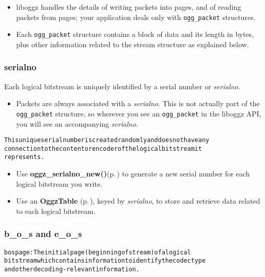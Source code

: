\begin{itemize}
\item liboggz handles the details of writing packets into pages, and of reading packets from pages; your application deals only with {\tt ogg\_\-packet} structures.\item Each {\tt ogg\_\-packet} structure contains a block of data and its length in bytes, plus other information related to the stream structure as explained below.\end{itemize}
\subsubsection{serialno}\label{serialno}
Each logical bitstream is uniquely identified by a serial number or {\em serialno\/}.

\begin{itemize}
\item Packets are always associated with a {\em serialno\/}. This is not actually part of the {\tt ogg\_\-packet} structure, so wherever you see an {\tt ogg\_\-packet} in the liboggz API, you will see an accompanying {\em serialno\/}.\end{itemize}


\small\begin{alltt}
   This unique serial number is created randomly and does not have any
   connection to the content or encoder of the logical bitstream it
   represents.
\end{alltt}\normalsize 


\begin{itemize}
\item Use {\bf oggz\_\-serialno\_\-new()}{\rm (p.\,\pageref{oggz_8h_a27})} to generate a new serial number for each logical bitstream you write.\item Use an {\bf Oggz\-Table }{\rm (p.\,\pageref{oggz__table_8h})}, keyed by {\em serialno\/}, to store and retrieve data related to each logical bitstream.\end{itemize}
\subsubsection{b\_\-o\_\-s and e\_\-o\_\-s}\label{boseos}
\small\begin{alltt}
   bos page: The initial page (beginning of stream) of a logical
      bitstream which contains information to identify the codec type
      and other decoding-relevant information.\end{alltt}\normalsize 


